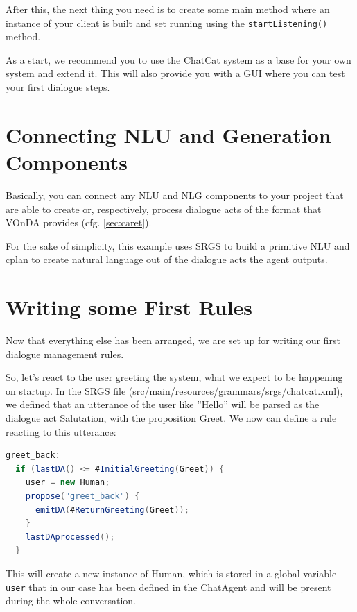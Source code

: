 \documentclass[a4paper]{report}
\newcommand{\vonda}{VOnDA\xspace}
\begin{document}
After this, the next thing you need is to create some main method where an
instance of your client is built and set running using the
\texttt{startListening()} method.

As a start, we recommend you to use the ChatCat system as a base for your own
system and extend it. This will also provide you with a GUI where you can test
your first dialogue steps.

\section{Connecting NLU and Generation Components}

Basically, you can connect any NLU and NLG components to your project that are
able to create or, respectively, process dialogue acts of the format that
\vonda provides (cfg. \ref{sec:caret}).

For the sake of simplicity, this example uses SRGS to build a primitive NLU and
cplan to create natural language out of the dialogue acts the agent outputs.

\section{Writing some First Rules}

Now that everything else has been arranged, we are set up for writing our first
dialogue management rules.

So, let's react to the user greeting the system, what we expect to be happening
on startup. In the SRGS file (src/main/resources/grammars/srgs/chatcat.xml), we
defined that an utterance of the user like ''Hello'' will be parsed as the
dialogue act Salutation, with the proposition Greet. We now can define a rule
reacting to this utterance:

\begin{lstlisting}[language=Java]
greet_back:
  if (lastDA() <= #InitialGreeting(Greet)) {
  	user = new Human;
    propose("greet_back") {
      emitDA(#ReturnGreeting(Greet));
    }
    lastDAprocessed();
  }
\end{lstlisting}

This will create a new instance of Human, which is stored in a global variable
\verb|user| that in our case has been defined in the ChatAgent and will be
present during the whole conversation.
\end{document}
